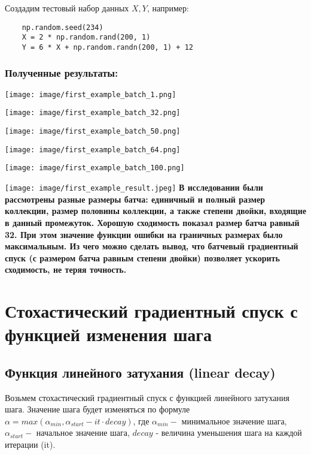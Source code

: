 \documentclass{article}
\begin{document}
\noindent Создадим тестовый набор данных $X, Y$, например:
\begin{verbatim}
    np.random.seed(234)
    X = 2 * np.random.rand(200, 1)
    Y = 6 * X + np.random.randn(200, 1) + 12
\end{verbatim}
\subsubsection*{Полученные результаты:}
\begin{center}
    \texttt{[image: image/first\_example\_batch\_1.png]}
    \label{fig:enter-label}
\end{center}
\begin{center}
    \texttt{[image: image/first\_example\_batch\_32.png]}
    \label{fig:enter-label}
\end{center}
\begin{center}
    \texttt{[image: image/first\_example\_batch\_50.png]}
    \label{fig:enter-label}
\end{center}
\begin{center}
    \texttt{[image: image/first\_example\_batch\_64.png]}
    \label{fig:enter-label}
\end{center}
\begin{center}
    \texttt{[image: image/first\_example\_batch\_100.png]}
    \label{fig:enter-label}
\end{center}
\texttt{[image: image/first\_example\_result.jpeg]}
\textbf{В исследовании были рассмотрены разные размеры батча: единичный и полный размер коллекции, размер половины коллекции, а также степени двойки, входящие в данный промежуток. Хорошую сходимость показал размер батча равный 32. При этом значение функции ошибки на граничных размерах было максимальным. Из чего можно сделать вывод, что батчевый градиентный спуск (с размером батча равным степени двойки) позволяет ускорить сходимость, не теряя точность.}

\section*{Стохастический градиентный спуск с функцией изменения шага}
\subsection*{Функция линейного затухания (linear decay)}
Возьмем стохастический градиентный спуск с функцией линейного затухания шага.
Значение шага будет изменяться по формуле $\alpha = max(\alpha_{min}, \alpha_{start} - it \cdot decay)$, где $\alpha_{min} -$ минимальное значение шага, $\alpha_{start} -$ начальное значение шага, $decay$ - величина уменьшения шага на каждой итерации (it). \\
\end{document}
